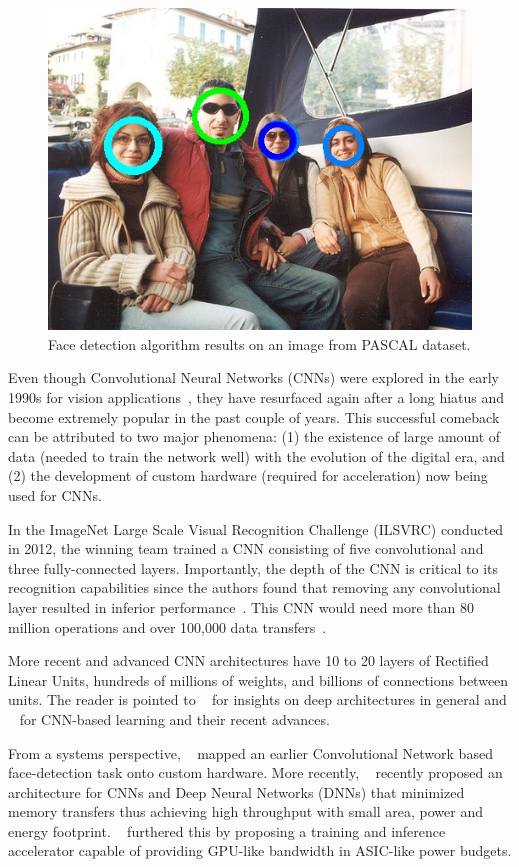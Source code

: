 \begin{figure}[htb!]
\vspace{0pt}
\centering
\includegraphics[width=0.9\linewidth]{./figures/facedetected.jpg}
\vspace{0pt}
\caption{Face detection algorithm results on an image from PASCAL dataset.}\label{fig:opencv_face_detection}
\vspace{0pt}
\end{figure}

Even though Convolutional Neural Networks (CNNs) were explored in the early 1990s for vision applications~\cite{giles1997}, they have resurfaced again after a long hiatus and become extremely popular in the past couple of years. 
This successful comeback can be attributed to two major phenomena:
(1) the existence of large amount of data (needed to train the network well) with the evolution of the digital era, and (2) the development of 
custom hardware (required for acceleration) now being used for CNNs. 

In the ImageNet Large Scale Visual Recognition Challenge (ILSVRC)
conducted in 2012, the winning team trained a CNN consisting of five convolutional and three fully-connected layers. Importantly, the depth of the CNN is critical to 
its recognition capabilities since the authors found that removing any convolutional layer resulted in inferior performance~\cite{NIPS2012}. This CNN would need
more than 80 million operations and over 100,000 data transfers~\cite{XilinxCNN}.

More recent and advanced CNN architectures have 10 to 20 layers of Rectified Linear Units, hundreds of millions of weights, and billions of connections between units.
The reader is pointed to ~\cite{Bengio2009} for insights on deep architectures in general and ~\cite{DNNNature2015} for CNN-based learning and their recent advances. 

From a systems perspective, ~\cite{Farabet2009} mapped an earlier Convolutional Network based face-detection task onto custom hardware. More recently, ~\cite{Chen2014} recently proposed an architecture for CNNs and Deep 
Neural Networks (DNNs) that minimized memory transfers thus achieving high
throughput with small area, power and energy footprint. ~\cite{DaDianNao} furthered this by proposing a training and inference accelerator 
capable of providing GPU-like bandwidth in ASIC-like power budgets.
